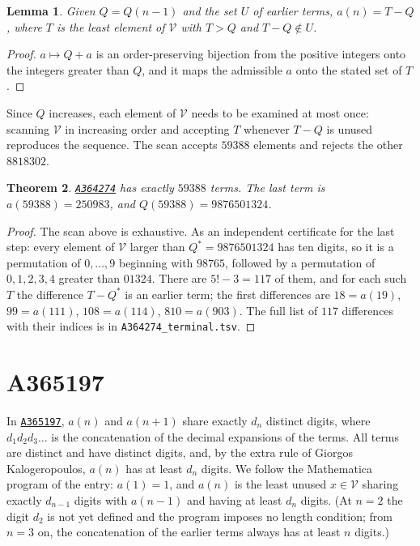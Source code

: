 \documentclass[11pt,a4paper]{article}
\newtheorem{theorem}{Theorem}
\newtheorem{lemma}[theorem]{Lemma}
\theoremstyle{remark}
\newcommand{\oeis}[1]{\href{https://oeis.org/#1}{\texttt{#1}}}
\begin{document}
\begin{lemma}
Given $Q=Q(n-1)$ and the set $U$ of earlier terms, $a(n)=T-Q$, where $T$ is the least element of $\mathcal V$ with $T>Q$ and $T-Q\notin U$.
\end{lemma}

\begin{proof}
$a\mapsto Q+a$ is an order-preserving bijection from the positive integers onto the integers greater than $Q$, and it maps the admissible $a$ onto the stated set of $T$.
\end{proof}

Since $Q$ increases, each element of $\mathcal V$ needs to be examined at most once: scanning $\mathcal V$ in increasing order and accepting $T$ whenever $T-Q$ is unused reproduces the sequence. The scan accepts $59388$ elements and rejects the other $8818302$.

\begin{theorem}
\oeis{A364274} has exactly $59388$ terms. The last term is $a(59388)=250983$, and $Q(59388)=9876501324$.
\end{theorem}

\begin{proof}
The scan above is exhaustive. As an independent certificate for the last step: every element of $\mathcal V$ larger than $Q^*=9876501324$ has ten digits, so it is a permutation of $0,\dots,9$ beginning with $98765$, followed by a permutation of $0,1,2,3,4$ greater than $01324$. There are $5!-3=117$ of them, and for each such $T$ the difference $T-Q^*$ is an earlier term; the first differences are $18=a(19)$, $99=a(111)$, $108=a(114)$, $810=a(903)$. The full list of $117$ differences with their indices is in \texttt{A364274\_terminal.tsv}.
\end{proof}

\section{A365197}\label{sec:365197}

In \oeis{A365197}, $a(n)$ and $a(n+1)$ share exactly $d_n$ distinct digits, where $d_1d_2d_3\dots$ is the concatenation of the decimal expansions of the terms. All terms are distinct and have distinct digits, and, by the extra rule of Giorgos Kalogeropoulos, $a(n)$ has at least $d_n$ digits. We follow the Mathematica program of the entry: $a(1)=1$, and $a(n)$ is the least unused $x\in\mathcal V$ sharing exactly $d_{n-1}$ digits with $a(n-1)$ and having at least $d_n$ digits. (At $n=2$ the digit $d_2$ is not yet defined and the program imposes no length condition; from $n=3$ on, the concatenation of the earlier terms always has at least $n$ digits.)
\end{document}
